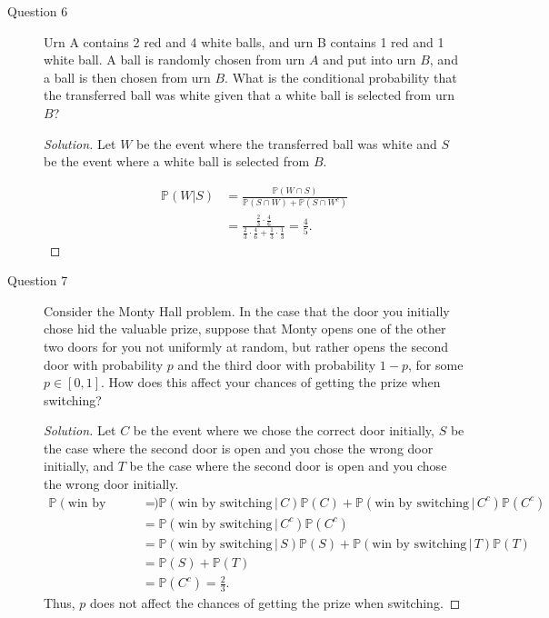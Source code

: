 \documentclass[addpoints, 11pt]{exam}
\newcommand*{\prob}{\mathds{P}}
\begin{document}
\begin{description}
    \newpage

    \item[Question 6] Urn A contains 2 red and 4 white balls, and urn B contains 1 red and 1 white ball. A ball is randomly chosen from urn $A$ and put into urn $B$, and a ball is then chosen from urn $B$. What is the conditional probability that the transferred ball was white given that a white ball is selected from urn $B$?

    \begin{proof}[Solution]
        Let $W$ be the event where the transferred ball was white and $S$ be the event where a white ball is selected from $B$.

        \begin{align}
            \prob(W|S)
            &= \frac{\prob(W \cap S)}{\prob(S \cap W) + \prob(S \cap W^c)} \\
            &= \frac{\frac{2}{3} \cdot \frac{4}{6}}{\frac{2}{3} \cdot \frac{4}{6} + \frac{1}{3} \cdot \frac{1}{3}} = \frac{4}{5}.
        \end{align}
    \end{proof}

\newpage

    \item[Question 7] Consider the Monty Hall problem. In the case that the door you initially chose hid the valuable prize, suppose that Monty opens one of the other two doors for you not uniformly at random, but rather opens the second door with probability $p$ and the third door with probability $1 - p$, for some $p \in [0, 1]$. How does this affect your chances of getting the prize when switching?

    \begin{proof}[Solution]
        Let $C$ be the event where we chose the correct door initially, $S$ be the case where the second door is open and you chose the wrong door initially, and $T$ be the case where the second door is open and you chose the wrong door initially.
        \begin{align}
            \prob(\text{win by switching})
            &= \prob(\text{win by switching} \, | \, C)\prob(C) + \prob(\text{win by switching} \, | \, C^c)\prob(C^c) \\
            &= \prob(\text{win by switching} \, | \, C^c)\prob(C^c) \\
            &= \prob(\text{win by switching} \, | \, S)\prob(S) + \prob(\text{win by switching} \, | \, T)\prob(T) \\
            &= \prob(S) + \prob(T) \\
            &= \prob(C^c) = \frac{2}{3}.
        \end{align}
        Thus, $p$ does not affect the chances of getting the prize when switching.
    \end{proof}


\end{description}
\end{document}
